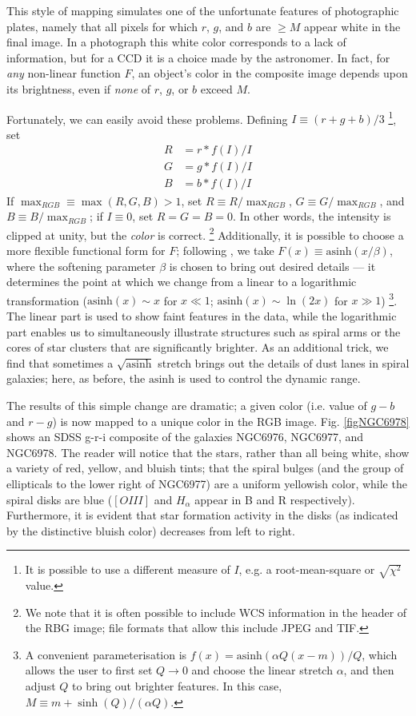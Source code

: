 \documentclass[preprint]{aastex}		%
\newcommand{\asinh}{\textrm{asinh}}
\begin{document}
This style of mapping simulates one of the unfortunate features of
photographic plates, namely that all pixels for which $r$, $g$, and $b$
are $\ge M$ appear white in the final image.  In a photograph this
white color corresponds to a lack of information, but for a CCD it
is a choice made by the astronomer.  In fact, for \emph{any} non-linear
function $F$, an object's color in the composite image depends upon
its brightness, even if \emph{none} of $r$, $g$, or $b$ exceed $M$.

Fortunately, we can easily avoid these problems.
%
Defining $I \equiv (r + g + b)/3$
\footnote{It is possible to use a different measure of $I$, e.g. a root-mean-square or $\sqrt{\chi^2}$ value.}, set
\begin{eqnarray}
\label{EqIntensityStretch}
\nonumber R &= r*f(I)/I\\
          G &= g*f(I)/I\\
\nonumber B &= b*f(I)/I
\end{eqnarray}
\newcommand{\rlineto}{\equiv}%
If $\max_{RGB} \equiv \max(R, G, B) > 1$, set $R \rlineto
R/\max_{RGB}$, $G \rlineto G/\max_{RGB}$, and $B \rlineto B/\max_{RGB}$;
if $I \equiv 0$, set $R = G = B = 0$.
In other words, the intensity is clipped at unity, but the \emph{color} is
correct.
\footnote{We note that it is often possible to include WCS information
in the header of the RBG image; file formats that allow this include
JPEG and TIF.}
Additionally, it is possible to choose a more flexible
functional form for $F$; following \cite{asinhMags}, we take $F(x)
\equiv \asinh(x/\beta)$, where the softening parameter $\beta$ is
chosen to bring out desired details --- it determines the point at
which we change from a linear to a logarithmic transformation
($\asinh(x) \sim x$ for $x \ll 1$; $\asinh(x) \sim \ln(2x)$ for $x \gg
1$)
\footnote{A convenient parameterisation is $f(x) = \asinh(\alpha Q (x-m))/Q$,
  which allows the user to first set $Q \rightarrow 0$ and choose the linear
  stretch $\alpha$, and then adjust $Q$ to bring out brighter features. In this
  case, $M \equiv m + \sinh(Q)/(\alpha Q)$.}.
The linear part is used to show faint features in the data,
while the logarithmic part enables us to simultaneously illustrate
structures such as spiral arms or the cores of star clusters that are
significantly brighter. As an additional trick, we find that sometimes
a $\sqrt{\asinh}$ stretch brings out the details of dust lanes in
spiral galaxies; here, as before, the $\asinh$ is used to control the
dynamic range.

The results of this simple change are dramatic; a given color
(i.e. value of $g-b$ and $r-g$) is now mapped to a unique color in the
RGB image.  Fig.  \ref{figNGC6978} shows an SDSS \citep{York} g-r-i
composite of the galaxies NGC6976, NGC6977, and NGC6978.  The reader
will notice that the stars, rather than all being white, show a
variety of red, yellow, and bluish tints; that the spiral bulges (and
the group of ellipticals to the lower right of NGC6977) are a uniform
yellowish color, while the spiral disks are blue ($[OIII]$ and
$H_\alpha$ appear in B and R respectively). Furthermore, it is evident
that star formation activity in the disks (as indicated by the
distinctive bluish color) decreases from left to right.
\end{document}

